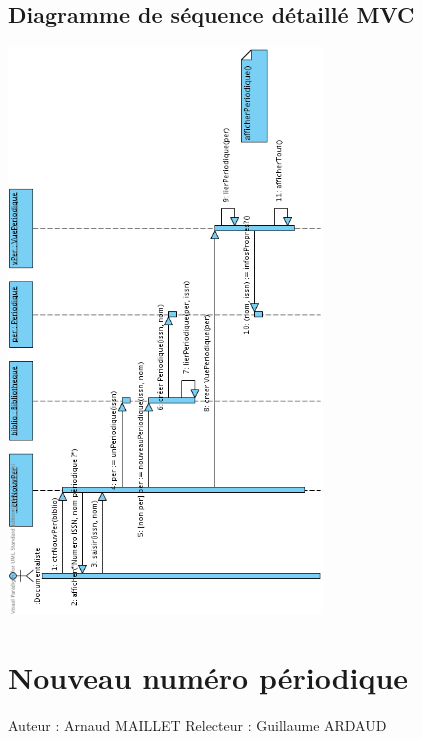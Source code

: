 \documentclass[a4paper,10pt]{report}
\begin{document}
\section*{Diagramme de séquence détaillé MVC}
\includegraphics[height=150mm]{NouvPerMVC.png}

\newpage


\chapter*{Nouveau numéro périodique}

Auteur : Arnaud MAILLET
Relecteur : Guillaume ARDAUD

\bigskip
\end{document}
